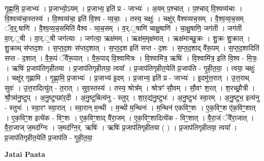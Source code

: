 \documentclass[17pt]{extarticle}
\begin{document}
गृ॒ह्णा॒मि॒ प्र॒जाभ्यः॑ । प्र॒जाभ्यो॒ऽयम् । प्र॒जाभ्य॒ इति॑ प्र - जाभ्यः॑ । अ॒यम् प॒श्चात् । प॒श्चाद् वि॒श्वव्य॑चाः । वि॒श्वव्य॑चा॒स्तस्य॑ । वि॒श्वव्य॑चा॒ इति॑ वि॒श्व - व्य॒चाः॒ । तस्य॒ चक्षुः॑ । चक्षु॑र् वैश्वव्यच॒सम् । वै॒श्व॒व्य॒च॒सम् ॅव॒र्॒.षाणि॑ । वै॒श्व॒व्य॒च॒समिति॑ वैश्व - व्य॒च॒सम् । व॒र्.॒षाणि॑ चाक्षु॒षाणि॑ । चा॒क्षु॒षाणि॒ जग॑ती । जग॑ती वा॒र्.॒षी । वा॒र्.॒षी जग॑त्याः । जग॑त्या॒ ऋक्ष॑मम् । ऋक्ष॑म॒मृक्ष॑मात् । ऋक्ष॑माच्छु॒क्रः । शु॒क्रः शु॒क्रात् । शु॒क्राथ् स॑प्तद॒शः । स॒प्त॒द॒शः स॑प्तद॒शात् । स॒प्त॒द॒श इति॑ सप्त - द॒शः । स॒प्त॒द॒शाद् वै॑रू॒पम् । स॒प्त॒द॒शादिति॑ सप्त - द॒शात् । वै॒रू॒पं ॅवै॑रू॒पात् । वै॒रू॒पाद् वि॒श्वामि॑त्रः । वि॒श्वामि॑त्र॒ ऋषिः॑ । वि॒श्वामि॑त्र॒ इति॑ वि॒श्व - मि॒त्रः॒ । ऋषिः॑ प्र॒जाप॑तिगृहीतया । प्र॒जाप॑तिगृहीतया॒ त्वया᳚ । प्र॒जाप॑तिगृहीत॒येति॑ प्र॒जाप॑ति - गृ॒ही॒त॒या॒ । त्वया॒ चक्षुः॑ । चक्षु॑र् गृह्णामि । गृ॒ह्णा॒मि॒ प्र॒जाभ्यः॑ । प्र॒जाभ्य॑ इ॒दम् । प्र॒जाभ्य॒ इति॑ प्र - जाभ्यः॑ । इ॒दमु॑त्त॒रात् । उ॒त्त॒राथ् सुवः॑ । उ॒त्त॒रादित्यु॑त् - त॒रात् । सुव॒स्तस्य॑ । तस्य॒ श्रोत्र᳚म् । श्रोत्रꣳ॑ सौ॒वम् । सौ॒वꣳ श॒रत् । श॒रच्छ्रौ॒त्री । श्रौ॒त्र्य॑नु॒ष्टुप् । अ॒नु॒ष्टुप्छा॑र॒दी । अ॒नु॒ष्टुबित्य॑नु - स्तुप् । शा॒र॒द्य॑नु॒ष्टुभः॑ । अ॒नु॒ष्टुभः॑ स्वा॒रम् । अ॒नु॒ष्टुभ॒ इत्य॑नु - स्तुभः॑ । स्वा॒रꣳ स्वा॒रात् । स्वा॒रान् म॒न्थी । म॒न्थी म॒न्थिनः॑ । म॒न्थिन॑ एकविꣳ॒॒शः । ए॒क॒विꣳ॒॒श ए॑क॒विꣳ॒॒शात् । ए॒क॒विꣳ॒॒श इत्ये॑क - विꣳ॒॒शः । ए॒क॒विꣳ॒॒शाद् वै॑रा॒जम् । ए॒क॒विꣳ॒॒शादित्ये॑क - विꣳ॒॒शात् । वै॒रा॒जं ॅवै॑रा॒जात् । वै॒रा॒जाज् ज॒मद॑ग्निः । ज॒मद॑ग्नि॒र्. ऋषिः॑ । ऋषिः॑ प्र॒जाप॑तिगृहीतया ( ) । प्र॒जाप॑तिगृहीतया॒ त्वया᳚ । प्र॒जाप॑तिगृहीत॒येति॑ प्र॒जाप॑ति - गृ॒ही॒त॒या॒ \newline

\textbf{Jatai Paata} \newline
\end{document}
